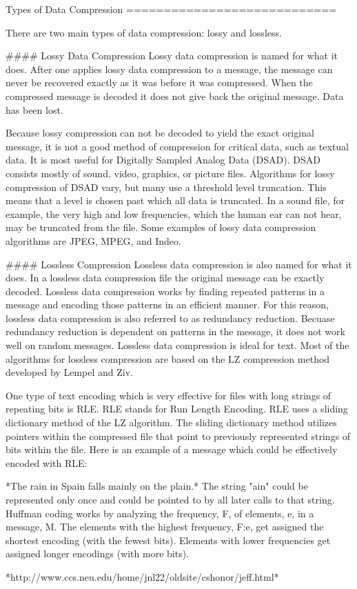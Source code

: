 Types of Data Compression
============================

There are two main types of data compression: lossy and lossless.


#### Lossy Data Compression
Lossy data compression is named for what it does. After one applies lossy data compression to a message, the message can never be recovered exactly as it was before it was compressed. When the compressed message is decoded it does not give back the original message. Data has been lost.

Because lossy compression can not be decoded to yield the exact original message, it is not a good method of compression for critical data, such as textual data. It is most useful for Digitally Sampled Analog Data (DSAD). DSAD consists mostly of sound, video, graphics, or picture files. Algorithms for lossy compression of DSAD vary, but many use a threshold level truncation. This means that a level is chosen past which all data is truncated. In a sound file, for example, the very high and low frequencies, which the human ear can not hear, may be truncated from the file. Some examples of lossy data compression algorithms are JPEG, MPEG, and Indeo.

#### Lossless Compression
Lossless data compression is also named for what it does. In a lossless data compression file the original message can be exactly decoded. Lossless data compression works by finding repeated patterns in a message and encoding those patterns in an efficient manner. For this reason, lossless data compression is also referred to as redundancy reduction. Becuase redundancy reduction is dependent on patterns in the message, it does not work well on random messages. Lossless data compression is ideal for text. Most of the algorithms for lossless compression are based on the LZ compression method developed by Lempel and Ziv.

One type of text encoding which is very effective for files with long strings of repeating bits is RLE. RLE stands for Run Length Encoding. RLE uses a sliding dictionary method of the LZ algorithm. The sliding dictionary method utilizes pointers within the compressed file that point to previously represented strings of bits within the file. Here is an example of a message which could be effectively encoded with RLE:

*The rain in Spain falls mainly on the plain.*
The string "ain" could be represented only once and could be pointed to by all later calls to that string.
Huffman coding works by analyzing the frequency, F, of elements, e, in a message, M. 
The elements with the highest frequency, F:e, get assigned the shortest encoding (with the fewest bits). 
Elements with lower frequencies get assigned longer encodings (with more bits). 

*http://www.ccs.neu.edu/home/jnl22/oldsite/cshonor/jeff.html*
